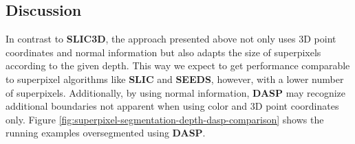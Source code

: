 \subsection{Discussion}

In contrast to \textbf{SLIC3D}, the approach presented above not only uses 3D point coordinates and normal information but also adapts the size of superpixels according to the given depth. This way we expect to get performance comparable to superpixel algorithms like \textbf{SLIC} and \textbf{SEEDS}, however, with a lower number of superpixels. Additionally, by using normal information, \textbf{DASP} may recognize additional boundaries not apparent when using color and 3D point coordinates only. Figure \ref{fig:superpixel-segmentation-depth-dasp-comparison} shows the running examples oversegmented using \textbf{DASP}.
\begin{figure}[t]
	\centering
\end{figure}
